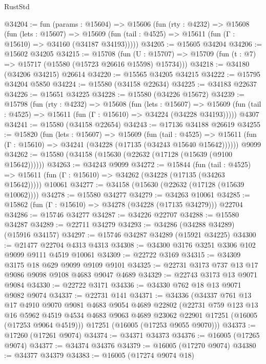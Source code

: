 \begin{lexlean}{RustStd}
\begin{coremodule}
@34204 := fun (params : @15604) =>
  @15606
    (fun (rty : @4232) =>
    @15608
      (fun (lets : @15607) =>
      @15609 (fun (tail : @4525) => @15611 (fun (Γ : @15610) => @34160 (@34187 @34193)))))
@34205 := @15605 @34204
@34206 := @15602 @34205
@34215 := @15708
    (fun (U : @15707) => @15709 (fun (t : @7) => @15717 (@15580 (@15723 @26616 @15598) @15734)))
@34218 := @34180 (@34206 @34215) @26614
@34220 := @15565 @34205 @34215
@34222 := @15795 @34204 @5850
@34224 := @15580 (@34158 @22634)
@34225 := @34183 @22637
@34226 := @15651 @34225
@34228 := @15580 (@34226 @15672)
@34239 := @15798
    (fun (rty : @4232) =>
    @15608
      (fun (lets : @15607) =>
      @15609 (fun (tail : @4525) => @15611 (fun (Γ : @15610) => @34224 (@34228 @34193)))))
    @4307
@34241 := @15580 (@34158 @22654)
@34243 := @17136 @34188 @26619
@34255 := @15820
    (fun (lets : @15607) =>
    @15609
      (fun (tail : @4525) =>
      @15611 (fun (Γ : @15610) => @34241 (@34228 (@17135 (@34243 @15640 @15642))))))
    @9099
@34262 := @15580 (@34158 (@15630 (@22632 (@17128 (@15639 (@9100 @15642))))))
@34263 := @34243 @9099
@34272 := @15844
    (fun (tail : @4525) => @15611 (fun (Γ : @15610) => @34262 (@34228 (@17135 (@34263 @15642)))))
    @10061
@34277 := @34158 (@15630 (@22632 (@17128 (@15639 @10062))))
@34278 := @15580 @34277
@34279 := @34263 @10061
@34285 := @15862 (fun (Γ : @15610) => @34278 (@34228 (@17135 @34279))) @22704
@34286 := @15746 @34277
@34287 := @34226 @22707
@34288 := @15580 @34287
@34289 := @22711 @34279
@34293 := @34286 (@34288 @34289) (@15916 @34157)
@34297 := @15746 @34287 @34289 (@15921 @34225)
@34300 := @21477 @22704 @4313 @4313
@34308 := @34300 @3176 @3251 @3306 @102 @9099 @9111 @4519 @10061
@34309 := @22722 @3169
@34315 := @34309 @3175 @18 @629 @9099 @9109 @9101
@34325 := @22731 @3173 @737 @13 @17 @9086 @9098 @9108 @4683 @9047 @4689
@34329 := @22743 @3173 @13 @9071 @9084
@34330 := @22722 @3171
@34336 := @34330 @762 @18 @13 @9071 @9082 @9074
@34337 := @22731 @141
@34371 := @34336
    (@34337
      @761
      @13
      @17
      @4910
      @9070
      @9081
      @4683
      @9054
      @4689
      @22802
      (@22731
        @759
        @123
        @13
        @16
        @5962
        @4519
        @4534
        @4683
        @9063
        @4689
        @23062
        @22901
        @17251
        (@16005 (@17253 @9064 @4519)))
      @17251
      (@16005 (@17253 @9055 @9070)))
@34373 := @17260 (@17261 @9074)
@34374 := @34371 @34373
@34376 := @16005 (@17265 @9074)
@34377 := @34374 @34376
@34379 := @16005 (@17270 @9074)
@34380 := @34377 @34379
@34383 := @16005 (@17274 @9074 @18)

\end{coremodule}
\end{lexlean}
